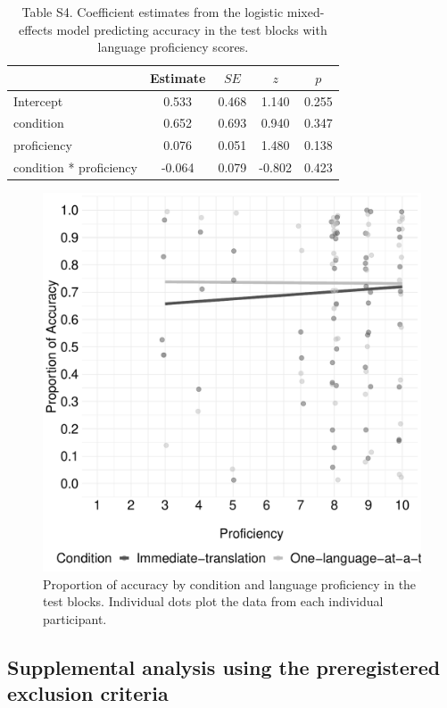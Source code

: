 \documentclass[
  man,floatsintext]{apa7}
\begin{document}
\begin{table}[tbp]

\begin{center}
\begin{threeparttable}

\caption{\label{tab:unnamed-chunk-11}Table S4. Coefficient estimates from the logistic mixed-effects model predicting accuracy in the test blocks with language proficiency scores.}

\begin{tabular}{lcccc}
\toprule
 & Estimate & $SE$ & $z$ & $p$\\
\midrule
Intercept & 0.533 & 0.468 & 1.140 & 0.255\\
condition & 0.652 & 0.693 & 0.940 & 0.347\\
proficiency & 0.076 & 0.051 & 1.480 & 0.138\\
condition * proficiency & -0.064 & 0.079 & -0.802 & 0.423\\
\bottomrule
\end{tabular}

\end{threeparttable}
\end{center}

\end{table}

\begin{figure}

{\centering \includegraphics[width=0.5\linewidth]{TabletSwitch_supplemental_files/figure-latex/FigureS2-1} 

}

\caption{Proportion of accuracy by condition and language proficiency in the test blocks. Individual dots plot the data from each individual participant.}\label{fig:FigureS2}
\end{figure}

\hypertarget{supplemental-analysis-using-the-preregistered-exclusion-criteria}{%
\subsection{Supplemental analysis using the preregistered exclusion criteria}\label{supplemental-analysis-using-the-preregistered-exclusion-criteria}}
\end{document}

